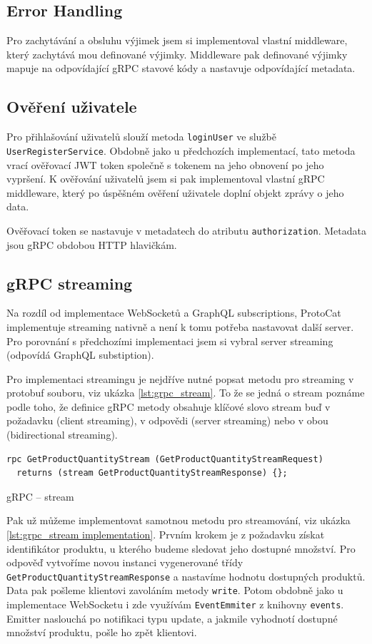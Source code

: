 \documentclass[thesis=M,czech]{FITthesis}[2019/12/23]
\begin{document}
\subsection{Error Handling}
Pro zachytávání a obsluhu výjimek jsem si implementoval vlastní middleware, který zachytává mou definované výjimky. Middleware pak definované výjimky mapuje na odpovídající gRPC stavové kódy a nastavuje odpovídající metadata.

\subsection{Ověření uživatele}
Pro přihlašování uživatelů slouží metoda \texttt{loginUser} ve službě \texttt{UserRegisterService}. Obdobně jako u předchozích implementací, tato metoda vrací ověřovací JWT token společně s tokenem na jeho obnovení po jeho vypršení. K ověřování uživatelů jsem si pak implementoval vlastní gRPC middleware, který po úspěšném ověření uživatele doplní objekt zprávy o jeho data.

Ověřovací token se nastavuje v metadatech do atributu \texttt{authorization}. Metadata jsou gRPC obdobou HTTP hlavičkám.

\subsection{gRPC streaming}
Na rozdíl od implementace WebSocketů a GraphQL subscriptions, ProtoCat implementuje streaming nativně a není k tomu potřeba nastavovat další server. Pro porovnání s předchozími implementaci jsem si vybral server streaming (odpovídá GraphQL substiption).

Pro implementaci streamingu je nejdříve nutné popsat metodu pro streaming v protobuf souboru, viz ukázka \ref{lst:grpc_stream}. To že se jedná o stream poznáme podle toho, že definice gRPC metody obsahuje klíčové slovo stream buď v požadavku (client streaming), v odpovědi (server streaming) nebo v obou (bidirectional streaming).

\begin{listing}[H]
\begin{verbatim}
rpc GetProductQuantityStream (GetProductQuantityStreamRequest)
  returns (stream GetProductQuantityStreamResponse) {};
\end{verbatim}
\caption{gRPC -- stream}
\label{lst:grpc_stream}
\end{listing}

Pak už můžeme implementovat samotnou metodu pro streamování, viz ukázka \ref{lst:grpc_stream implementation}. Prvním krokem je z požadavku získat identifikátor produktu, u kterého budeme sledovat jeho dostupné množství. Pro odpověď vytvoříme novou instanci vygenerované třídy \texttt{GetProductQuantityStreamResponse} a nastavíme hodnotu dostupných produktů. Data pak pošleme klientovi zavoláním metody \texttt{write}. Potom obdobně jako u implementace WebSocketu i zde využívám \texttt{EventEmmiter} z knihovny \texttt{events}. Emitter naslouchá po notifikaci typu update, a jakmile vyhodnotí dostupné množství produktu, pošle ho zpět klientovi.
\end{document}
